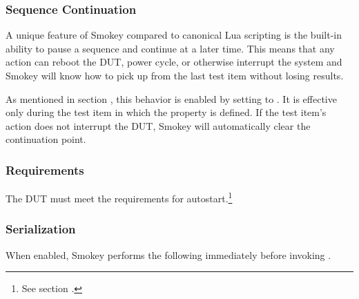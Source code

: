 \subsubsection{Sequence Continuation}

A unique feature of Smokey compared to canonical Lua scripting is the built-in
ability to pause a sequence and continue at a later time.  This means that any
action can reboot the DUT, power cycle, or otherwise interrupt the system and
Smokey will know how to pick up from the last test item without losing results.

As mentioned in section , this behavior is
enabled by setting  to .  It is
effective only during the test item in which the property is defined.  If the
test item's action does not interrupt the DUT, Smokey will automatically clear
the continuation point.

\subsubsection{Requirements}

The DUT must meet the requirements for autostart.\footnote{See section
.}

\subsubsection{Serialization}

When enabled, Smokey performs the following immediately before invoking
.


